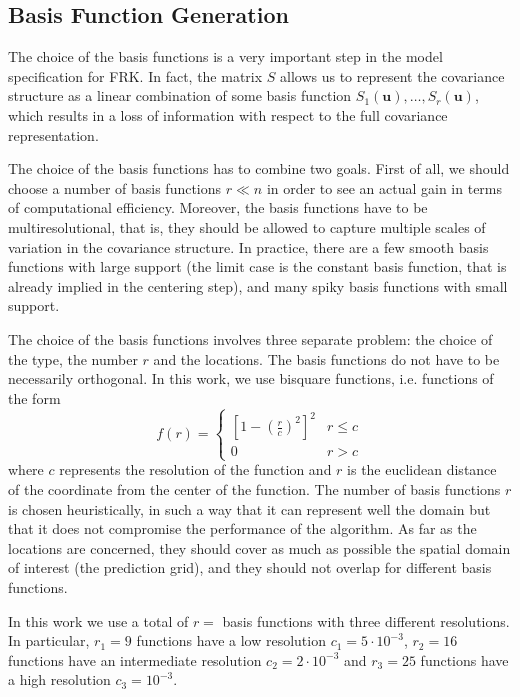 \documentclass[11pt]{article}
\begin{document}
\newpage
\subsection{Basis Function Generation}

The choice of the basis functions is a very important step in the model specification for FRK. In fact, the matrix $S$ allows us to represent the covariance structure as a linear combination of some basis function $S_1(\bm{u}), \dots, S_r(\bm{u})$, which results in a loss of information with respect to the full covariance representation.

The choice of the basis functions has to combine two goals. First of all, we should choose a number of basis functions $r \ll n$ in order to see an actual gain in terms of computational efficiency. Moreover, the basis functions have to be multiresolutional, that is, they should be allowed to capture multiple scales of variation in the covariance structure. In practice, there are a few smooth basis functions with large support (the limit case is the constant basis function, that is already implied in the centering step), and many spiky basis functions with small support. 

The choice of the basis functions involves three separate problem: the choice of the type, the number $r$ and the locations. The basis functions do not have to be necessarily orthogonal. In this work, we use bisquare functions, i.e. functions of the form
\begin{equation*}
f(r) = \begin{cases}
\left[ 1 - \left( \frac{r}{c} \right)^2 \right]^2 & r \leq c
\\
0 & r > c
\end{cases}
\end{equation*}
where $c$ represents the resolution of the function and $r$ is the euclidean distance of the coordinate from the center of the function. The number of basis functions $r$ is chosen heuristically, in such a way that it can represent well the domain but that it does not compromise the performance of the algorithm. As far as the locations are concerned, they should cover as much as possible the spatial domain of interest (the prediction grid), and they should not overlap for different basis functions.

In this work we use a total of $r = $ basis functions with three different resolutions. In particular, $r_1 = 9$ functions have a low resolution $c_1 = 5 \cdot 10^{-3}$, $r_2 = 16$ functions have an intermediate resolution $c_2 = 2 \cdot 10^{-3}$ and $r_3 = 25$ functions have a high resolution $c_3 = 10^{-3}$. 
\end{document}
